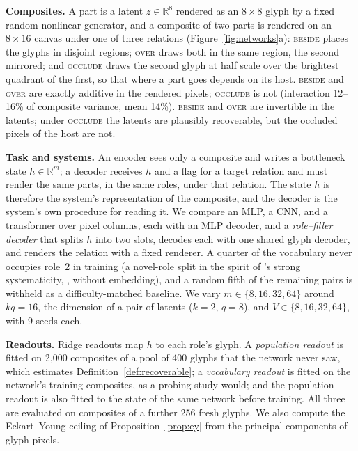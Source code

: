 \documentclass[10pt]{article}
\theoremstyle{plain}
\theoremstyle{remark}
\newcommand{\R}{\mathbb{R}}
\begin{document}
\textbf{Composites.} A part is a latent $z \in \R^{8}$ rendered as an $8 \times 8$ glyph by a fixed random nonlinear generator, and a composite of two parts is rendered on an $8 \times 16$ canvas under one of three relations (Figure~\ref{fig:networks}a): \textsc{beside} places the glyphs in disjoint regions; \textsc{over} draws both in the same region, the second mirrored; and \textsc{occlude} draws the second glyph at half scale over the brightest quadrant of the first, so that where a part goes depends on its host. \textsc{beside} and \textsc{over} are exactly additive in the rendered pixels; \textsc{occlude} is not (interaction 12--16\% of composite variance, mean 14\%). \textsc{beside} and \textsc{over} are invertible in the latents; under \textsc{occlude} the latents are plausibly recoverable, but the occluded pixels of the host are not.

\textbf{Task and systems.} An encoder sees only a composite and writes a bottleneck state $h \in \R^m$; a decoder receives $h$ and a flag for a target relation and must render the same parts, in the same roles, under that relation. The state $h$ is therefore the system's representation of the composite, and the decoder is the system's own procedure for reading it. We compare an MLP, a CNN, and a transformer over pixel columns, each with an MLP decoder, and a \emph{role--filler decoder} that splits $h$ into two slots, decodes each with one shared glyph decoder, and renders the relation with a fixed renderer. A quarter of the vocabulary never occupies role~2 in training (a novel-role split in the spirit of \citeauthor{hadley1994}'s strong systematicity, \citeyear{hadley1994}, without embedding), and a random fifth of the remaining pairs is withheld as a difficulty-matched baseline. We vary $m \in \{8, 16, 32, 64\}$ around $kq = 16$, the dimension of a pair of latents ($k = 2$, $q = 8$), and $V \in \{8, 16, 32, 64\}$, with 9 seeds each.

\textbf{Readouts.} Ridge readouts map $h$ to each role's glyph. A \emph{population readout} is fitted on 2{,}000 composites of a pool of 400 glyphs that the network never saw, which estimates Definition~\ref{def:recoverable}; a \emph{vocabulary readout} is fitted on the network's training composites, as a probing study would; and the population readout is also fitted to the state of the same network before training. All three are evaluated on composites of a further 256 fresh glyphs. We also compute the Eckart--Young ceiling of Proposition~\ref{prop:ey} from the principal components of glyph pixels.
\end{document}
